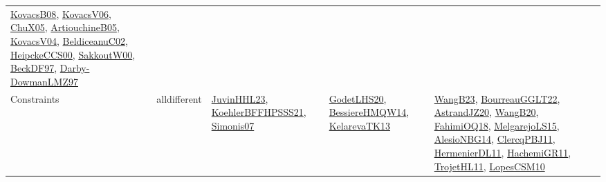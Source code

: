 {\begin{longtable}{lp{3cm}>{\raggedright}p{6cm}>{\raggedright}p{6cm}p{8cm}}
\href{articles/KovacsB08.pdf}{KovacsB08}\cite{KovacsB08}, \href{papers/KovacsV06.pdf}{KovacsV06}\cite{KovacsV06}, \href{papers/ChuX05.pdf}{ChuX05}\cite{ChuX05}, \href{papers/ArtiouchineB05.pdf}{ArtiouchineB05}\cite{ArtiouchineB05}, \href{papers/KovacsV04.pdf}{KovacsV04}\cite{KovacsV04}, \href{papers/BeldiceanuC02.pdf}{BeldiceanuC02}\cite{BeldiceanuC02}, \href{articles/HeipckeCCS00.pdf}{HeipckeCCS00}\cite{HeipckeCCS00}, \href{articles/SakkoutW00.pdf}{SakkoutW00}\cite{SakkoutW00}, \href{papers/BeckDF97.pdf}{BeckDF97}\cite{BeckDF97}, \href{articles/Darby-DowmanLMZ97.pdf}{Darby-DowmanLMZ97}\cite{Darby-DowmanLMZ97}\\
Constraints & alldifferent & \href{papers/JuvinHHL23.pdf}{JuvinHHL23}\cite{JuvinHHL23}, \href{articles/KoehlerBFFHPSSS21.pdf}{KoehlerBFFHPSSS21}\cite{KoehlerBFFHPSSS21}, \href{articles/Simonis07.pdf}{Simonis07}\cite{Simonis07} & \href{papers/GodetLHS20.pdf}{GodetLHS20}\cite{GodetLHS20}, \href{papers/BessiereHMQW14.pdf}{BessiereHMQW14}\cite{BessiereHMQW14}, \href{papers/KelarevaTK13.pdf}{KelarevaTK13}\cite{KelarevaTK13} & \href{papers/WangB23.pdf}{WangB23}\cite{WangB23}, \href{articles/BourreauGGLT22.pdf}{BourreauGGLT22}\cite{BourreauGGLT22}, \href{articles/AstrandJZ20.pdf}{AstrandJZ20}\cite{AstrandJZ20}, \href{papers/WangB20.pdf}{WangB20}\cite{WangB20}, \href{articles/FahimiOQ18.pdf}{FahimiOQ18}\cite{FahimiOQ18}, \href{papers/MelgarejoLS15.pdf}{MelgarejoLS15}\cite{MelgarejoLS15}, \href{papers/AlesioNBG14.pdf}{AlesioNBG14}\cite{AlesioNBG14}, \href{papers/ClercqPBJ11.pdf}{ClercqPBJ11}\cite{ClercqPBJ11}, \href{papers/HermenierDL11.pdf}{HermenierDL11}\cite{HermenierDL11}, \href{articles/HachemiGR11.pdf}{HachemiGR11}\cite{HachemiGR11}, \href{articles/TrojetHL11.pdf}{TrojetHL11}\cite{TrojetHL11}, \href{articles/LopesCSM10.pdf}{LopesCSM10}\cite{LopesCSM10}\\

\end{longtable}}

